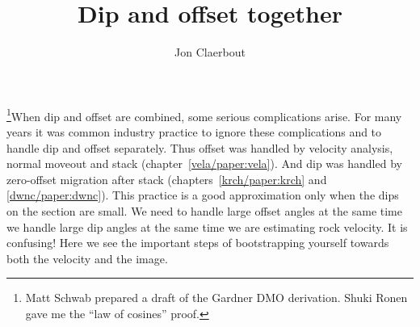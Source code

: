 \def\CAKEDIR{.}

\title{Dip and offset together}
\author{Jon Claerbout}
\maketitle
\label{paper:dpmv}

\def\vhalf{v_{\rm half}}

\par
\footnote{
	Matt Schwab prepared a draft of the Gardner DMO derivation.
	Shuki Ronen gave me the ``law of cosines'' proof.
	}When
dip and offset are combined,
some serious complications arise.
For many years it was common industry practice
to ignore these complications and to handle dip and offset separately.  
Thus offset was handled by velocity analysis, 
normal moveout and stack (chapter~\ref{vela/paper:vela}).
And dip was handled by zero-offset 
migration after stack (chapters~\ref{krch/paper:krch} and \ref{dwnc/paper:dwnc}).
This practice is a good approximation only when
the dips on the section are small.
We need to handle large offset angles at the same
time we handle large dip angles
at the same time we are estimating rock velocity.
It is confusing!
Here we see the important steps
of bootstrapping yourself towards both the velocity and the image.


